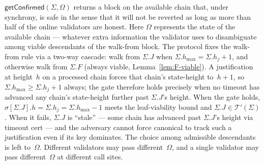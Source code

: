 \ifx\litemode\undefined\documentclass{article}\fi
\newcommand{\hmax}{\ensuremath{h_{\max}}\xspace}
\newcommand{\viableTree}{\ensuremath{\mathcal{T}'}}
\newcommand{\getConfirmed}{\textsf{getConfirmed}\xspace}
\theoremstyle{plain}
\theoremstyle{definition}
\theoremstyle{remark}
\begin{document}
$\getConfirmed(\Sigma, \Omega)$ returns a block on the available chain that, under synchrony, is safe in the sense that it will not be reverted as long as more than half of the online validators are honest.
Here $\Omega$ represents the state of the available chain --- whatever extra information the validator uses to disambiguate among viable descendants of the walk-from block.
The protocol fixes the walk-from rule via a two-way cascade: walk from $\Sigma.J$ when $\Sigma.\hmax = \Sigma.h_j + 1$, and otherwise walk from $\Sigma.F$ (always viable, Lemma~\ref{lem:F-viable}).
A justification at height~$h$ on a processed chain forces that chain's state-height to~$h + 1$, so $\Sigma.\hmax \geq \Sigma.h_j + 1$ always; the gate therefore holds precisely when no timeout has advanced any chain's state-height further past $\Sigma.J$'s height.
When the gate holds, $\sigma[\Sigma.J].h = \Sigma.h_j = \Sigma.\hmax - 1$ meets the leaf-viability bound and $\Sigma.J \in \viableTree(\Sigma)$.
When it fails, $\Sigma.J$ is ``stale'' --- some chain has advanced past $\Sigma.J$'s height via timeout cert --- and the adversary cannot force canonical to track such a justification even if its key dominates.
The choice among admissible descendants is left to~$\Omega$.
Different validators may pass different~$\Omega$, and a single validator may pass different~$\Omega$ at different call sites.
\end{document}
